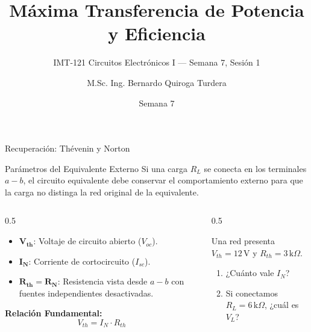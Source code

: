 \documentclass[aspectratio=169, table, xcdraw]{beamer}
\title[Máxima Transferencia]{Máxima Transferencia de Potencia y Eficiencia}
\subtitle{IMT-121 Circuitos Electrónicos I — Semana 7, Sesión 1}
\author[B. Quiroga Turdera]{M.Sc. Ing. Bernardo Quiroga Turdera}
\institute[UCB Tarija]{Universidad Católica Boliviana ``San Pablo'' — Sede Tarija}
\date{Semana 7}
\begin{document}
\begin{frame}
    \titlepage
\end{frame}

\begin{frame}{Recuperación: Thévenin y Norton}
    \begin{block}{Parámetros del Equivalente Externo}
        Si una carga $R_L$ se conecta en los terminales $a-b$, el circuito equivalente debe conservar el comportamiento externo para que la carga no distinga la red original de la equivalente.
    \end{block}
    
    \begin{columns}
        \begin{column}{0.5\textwidth}
            \begin{itemize}
                \item $\bm{V_{th}}$: Voltaje de circuito abierto ($V_{oc}$).
                \item $\bm{I_N}$: Corriente de cortocircuito ($I_{sc}$).
                \item $\bm{R_{th} = R_N}$: Resistencia vista desde $a-b$ con fuentes independientes desactivadas.
            \end{itemize}
            \vspace{0.2cm}
            \textbf{Relación Fundamental:}
            \begin{equation*}
                V_{th} = I_N \cdot R_{th}
            \end{equation*}
        \end{column}
        \begin{column}{0.5\textwidth}
            \begin{tcolorbox}[colback=white, colframe=ucbblue, title=Mini-Retrieval]
                Una red presenta $V_{th}=12\,\text{V}$ y $R_{th}=3\,\text{k}\Omega$.
                \begin{enumerate}
                    \item ¿Cuánto vale $I_N$?
                    \item Si conectamos $R_L=6\,\text{k}\Omega$, ¿cuál es $V_L$?
                \end{enumerate}
            \end{tcolorbox}
        \end{column}
    \end{columns}
\end{frame}
\end{document}
